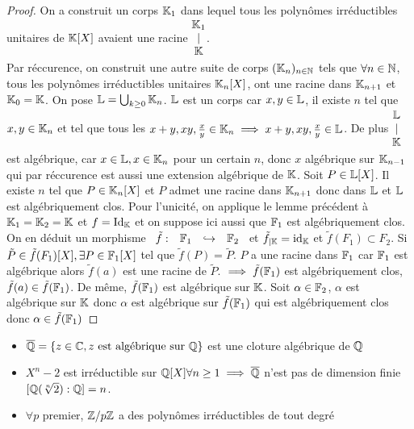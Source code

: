 \documentclass[]{report}
\begin{document}
    \begin{proof}
        On a construit un corps $\mathbb{K}_1$ dans lequel tous les polynômes irréductibles unitaires de $\mathbb{K}[X]$ avaient une racine $\begin{matrix}
            \mathbb{K}_1\\
            |\\
            \mathbb{K}
        \end{matrix}$.\\
        Par réccurence, on construit une autre suite de corps $(\mathbb{K}_n)_{n\in\mathbb{N}}$
        tels que $\forall {n\in\mathbb{N}}$, tous les polynômes irréductibles unitaires $\mathbb{K}_n[X]$, ont une racine dans $\mathbb{K}_{n+1}$ et $\mathbb{K}_0=\mathbb{K}$. On pose $\mathbb{L}=\bigcup_{k\ge 0}\mathbb{K}_n$. $\mathbb{L}$ est un corps car $x,y\in \mathbb{L}$, il existe $n$ tel que $x,y\in\mathbb{K}_n$ et tel que tous les $x+y,xy,\frac{x}{y}\in \mathbb{K}_n\implies x+y,xy,\frac{x}{y}\in\mathbb{L}$. De plus $\begin{matrix}
            \mathbb{L}\\
            |\\
            \mathbb{K}
        \end{matrix}$ est algébrique, car $x\in \mathbb{L},x\in\mathbb{K}_n$ pour un certain $n$, donc $x$ algébrique sur $\mathbb{K}_{n-1}$ qui par réccurence est aussi une extension algébrique de $\mathbb{K}$. Soit $P\in\mathbb{L}[X]$. Il existe $n$ tel que $P\in\mathbb{K}_n[X]$ et $P$ admet une racine dans $\mathbb{K}_{n+1}$ donc dans $\mathbb{L}$ et $\mathbb{L}$ est algébriquement clos. Pour l'unicité, on applique le lemme précédent à $\mathbb{K}_1=\mathbb{K}_2=\mathbb{K}$ et $f=\text{Id}_{\mathbb{K}}$ et on suppose ici aussi que $\mathbb{F}_1$ est algébriquement clos. On en déduit un morphisme $\begin{array}{ccccc} \tilde{f} : & \mathbb{F}_1 & \hookrightarrow & \mathbb{F}_2 \end{array}$ et $\tilde{f}_{|\mathbb{K}}=\text{id}_{\mathbb{K}}$ et $\tilde{f}(F_1)\subset F_2$. Si $\tilde{P}\in\tilde{f}(F_1)[X],\exists P\in \mathbb{F}_1[X]$ tel que $\tilde{f}(P)=\tilde{P}$. $P$ a une racine dans $\mathbb{F}_1$ car $\mathbb{F}_1$ est algébrique alors $\tilde{f}(a)$ est une racine de $\tilde{P}$. $\implies \tilde{f}(\mathbb{F}_1)$ est algébriquement clos, $\tilde{f}(a)\in\tilde{f}(\mathbb{F}_1)$. De même, $\tilde{f}(\mathbb{F}_1)$ est algébrique sur $\mathbb{K}$. Soit $\alpha\in \mathbb{F}_2$, $\alpha$ est algébrique sur $\mathbb{K}$ donc $\alpha$ est algébrique sur $\tilde{f}(\mathbb{F}_1)$ qui est algébriquement clos donc $\alpha\in\tilde{f}(\mathbb{F}_1)$
    \end{proof}

    \begin{re}{}{}
        \begin{itemize}
            \item $\overline{\mathbb{Q}}=\{z\in\mathbb{C},z\text{ est algébrique sur $\mathbb{Q}$}\}$ est une cloture algébrique de $\mathbb{Q}$
            \item $X^n-2$ est irréductible sur $\mathbb{Q}[X]\forall n\ge 1\implies \overline{\mathbb{Q}}$ n'est pas de dimension finie $[\mathbb{Q}(\sqrt[n]{2}):\mathbb{Q}]=n$.
            \item $\forall p$ premier, $\mathbb{Z}/p\mathbb{Z}$ a des polynômes irréductibles de tout degré
        \end{itemize}
    \end{re}
\end{document}
